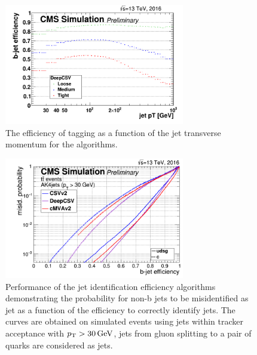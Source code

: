 \begin{figure}\centering
    \includegraphics[width=0.7\textwidth]{figure/reco_beff.png}
    \caption
    {
        The efficiency of \PQb tagging as a function of the jet transverse momentum for the \DeepCSV algorithms. 
    }
    \label{fig:reco_beff}
\end{figure}

\begin{figure}\centering
    \includegraphics[width=0.7\textwidth]{figure/reco_misb.png}
    \caption[\PQb misidentified efficiency as a function of the \PQb tagging efficiency.]
    {
        Performance of the \PQb jet identification efficiency algorithms demonstrating the probability for non-b jets to be misidentified as \PQb jet as a function of the efficiency to correctly identify \PQb jets. 
        The curves are obtained on simulated \ttbar events using jets within tracker acceptance with $p_{\mathrm{T}}>30 \,\text{Ge\hspace{-.08em}V}$, \PQb jets from gluon splitting to a pair of \PQb quarks are considered as \PQb jets.
    }
    \label{fig:reco_misb}
\end{figure}
